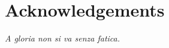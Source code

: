 \chapter*{Acknowledgements}
\label{C:Acknowledgements}


\begin{otherlanguage}{italian}
\textit{A gloria non si va senza fatica.
}
\end{otherlanguage}


